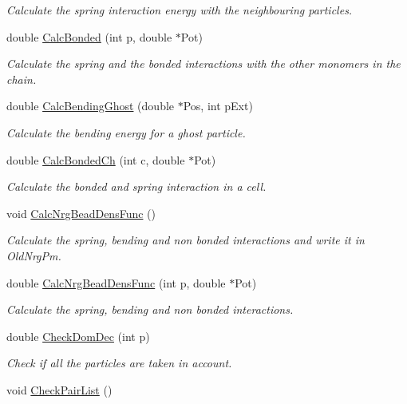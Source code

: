 \begin{DoxyCompactItemize}
\begin{DoxyCompactList}\small\item\em Calculate the spring interaction energy with the neighbouring particles. \end{DoxyCompactList}\item 
double \hyperlink{classForces_adb6d3708682daf3cc9dd70081adfb894}{Calc\+Bonded} (int p, double $\ast$Pot)
\begin{DoxyCompactList}\small\item\em Calculate the spring and the bonded interactions with the other monomers in the chain. \end{DoxyCompactList}\item 
double \hyperlink{classForces_a2ba180156b26af3e2eea135743275fa9}{Calc\+Bending\+Ghost} (double $\ast$Pos, int p\+Ext)
\begin{DoxyCompactList}\small\item\em Calculate the bending energy for a ghost particle. \end{DoxyCompactList}\item 
double \hyperlink{classForces_a6fec1e71c9031503f3f3b7a4f4851319}{Calc\+Bonded\+Ch} (int c, double $\ast$Pot)\hypertarget{classForces_a6fec1e71c9031503f3f3b7a4f4851319}{}\label{classForces_a6fec1e71c9031503f3f3b7a4f4851319}

\begin{DoxyCompactList}\small\item\em Calculate the bonded and spring interaction in a cell. \end{DoxyCompactList}\item 
void \hyperlink{classForces_a616546bdad154256f89f9eee067e8166}{Calc\+Nrg\+Bead\+Dens\+Func} ()\hypertarget{classForces_a616546bdad154256f89f9eee067e8166}{}\label{classForces_a616546bdad154256f89f9eee067e8166}

\begin{DoxyCompactList}\small\item\em Calculate the spring, bending and non bonded interactions and write it in Old\+Nrg\+Pm. \end{DoxyCompactList}\item 
double \hyperlink{classForces_ab18a8becb1983fc28fbeadea39623079}{Calc\+Nrg\+Bead\+Dens\+Func} (int p, double $\ast$Pot)
\begin{DoxyCompactList}\small\item\em Calculate the spring, bending and non bonded interactions. \end{DoxyCompactList}\item 
double \hyperlink{classForces_a2595efd4257201b5b7c30c73086f94c3}{Check\+Dom\+Dec} (int p)
\begin{DoxyCompactList}\small\item\em Check if all the particles are taken in account. \end{DoxyCompactList}\item 
void \hyperlink{classForces_a419ca9dee6d5e955abe44cf409e24d66}{Check\+Pair\+List} ()\hypertarget{classForces_a419ca9dee6d5e955abe44cf409e24d66}{}\label{classForces_a419ca9dee6d5e955abe44cf409e24d66}


\end{DoxyCompactItemize}

